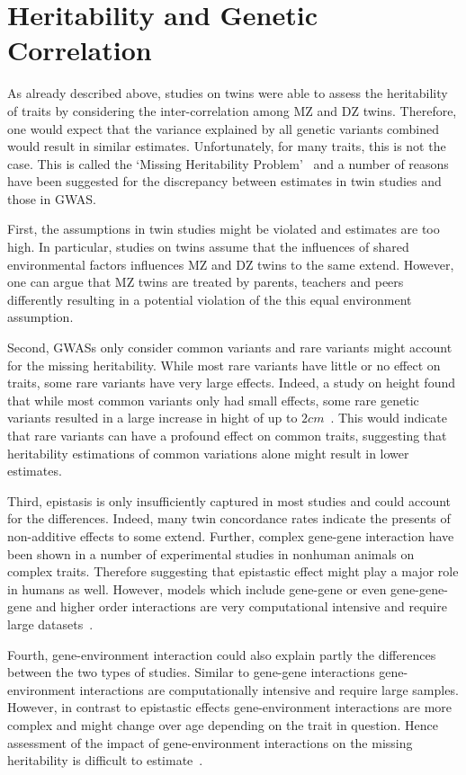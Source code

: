 \section{Heritability and Genetic Correlation}
\label{sec:heritability_and_genetic_correlation}

As already described above, studies on twins were able to assess the heritability of traits by considering the inter-correlation among MZ and DZ twins.
Therefore, one would expect that the variance explained by all genetic variants combined would result in similar estimates.
Unfortunately, for many traits, this is not the case.
This is called the `Missing Heritability Problem'~\cite{Vineis2010} and a  number of reasons have been suggested for the discrepancy between estimates in twin studies and those in GWAS\@.

First, the assumptions in twin studies might be violated and estimates are too high.
In particular, studies on twins assume that the influences of shared environmental factors influences MZ and DZ twins to the same extend.
However, one can argue that MZ twins are treated by parents, teachers and peers differently resulting in a potential violation of the this equal environment assumption. 

Second, GWASs only consider common variants and rare variants might account for the missing heritability.
While most rare variants have little or no effect on traits, some rare variants have very large effects.
Indeed, a study on height found that while most common variants only had small effects, some rare genetic variants resulted in a large increase in hight of up to $2cm$~\cite{Marouli2017}.
This would indicate that rare variants can have a profound effect on common traits, suggesting that heritability estimations of common variations alone might result in lower estimates.

Third, epistasis is only insufficiently captured in most studies and could account for the differences.
Indeed, many twin concordance rates indicate the presents of non-additive effects to some extend.
Further, complex gene-gene interaction have been shown in a number of experimental studies in nonhuman animals on complex traits.
Therefore suggesting that epistastic effect might play a major role in humans as well.
However, models which include gene-gene or even gene-gene-gene and higher order interactions are very computational intensive and require large datasets~\cite{Lippert2013}. 

Fourth, gene-environment interaction could also explain partly the differences between the two types of studies.
Similar to gene-gene interactions gene-environment interactions are computationally intensive and require large samples.
However, in contrast to epistastic effects gene-environment interactions are more complex and might change over age depending on the trait in question.
Hence assessment of the impact of gene-environment interactions on the missing heritability is difficult to estimate~\cite{Do2016,Kaprio2012}.

